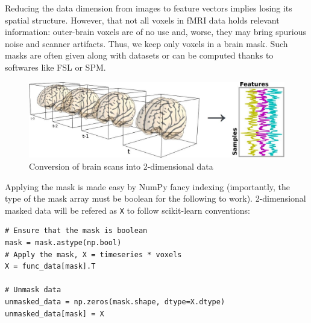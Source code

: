 \documentclass{frontiersSCNS} %
\newcommand{\alex}[1]{\todo[inline, color=green!40]{#1}}
\begin{document}
Reducing the data dimension from images to feature vectors implies losing its
spatial structure. However, that not all voxels in fMRI data holds 
relevant information: outer-brain voxels are of no
use and, worse, they may bring spurious noise and scanner artifacts.
Thus, we keep only voxels in a brain mask. Such masks
are often given along with datasets or can be computed thanks to softwares like
FSL or SPM.

\begin{figure}[hbtp]
    \begin{center}
        \includegraphics[width=.5\linewidth]{img/niimgs.jpg}
    \end{center}
    \caption{Conversion of brain scans into 2-dimensional data}
    \label{fig:niimg}
\end{figure}

Applying the mask is made easy by NumPy fancy indexing (importantly, the
type of the mask array must be boolean for the following to work).
2-dimensional masked data will be refered as \texttt{X} to follow
scikit-learn conventions:
\begin{lstlisting}
# Ensure that the mask is boolean
mask = mask.astype(np.bool)
# Apply the mask, X = timeseries * voxels
X = func_data[mask].T

# Unmask data
unmasked_data = np.zeros(mask.shape, dtype=X.dtype)
unmasked_data[mask] = X
\end{lstlisting}





\end{document}
